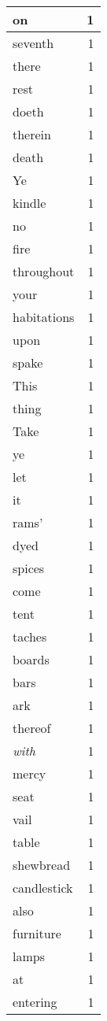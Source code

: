 \begin{center}
\begin{longtable}{l|r}
on & 1 \\ \hline
seventh & 1 \\ \hline
there & 1 \\ \hline
rest & 1 \\ \hline
doeth & 1 \\ \hline
therein & 1 \\ \hline
death & 1 \\ \hline
Ye & 1 \\ \hline
kindle & 1 \\ \hline
no & 1 \\ \hline
fire & 1 \\ \hline
throughout & 1 \\ \hline
your & 1 \\ \hline
habitations & 1 \\ \hline
upon & 1 \\ \hline
spake & 1 \\ \hline
This & 1 \\ \hline
thing & 1 \\ \hline
Take & 1 \\ \hline
ye & 1 \\ \hline
let & 1 \\ \hline
it & 1 \\ \hline
rams' & 1 \\ \hline
dyed & 1 \\ \hline
spices & 1 \\ \hline
come & 1 \\ \hline
tent & 1 \\ \hline
taches & 1 \\ \hline
boards & 1 \\ \hline
bars & 1 \\ \hline
ark & 1 \\ \hline
thereof & 1 \\ \hline
\emph{with} & 1 \\ \hline
mercy & 1 \\ \hline
seat & 1 \\ \hline
vail & 1 \\ \hline
table & 1 \\ \hline
shewbread & 1 \\ \hline
candlestick & 1 \\ \hline
also & 1 \\ \hline
furniture & 1 \\ \hline
lamps & 1 \\ \hline
at & 1 \\ \hline
entering & 1 \\ \hline

\end{longtable}
\end{center}
